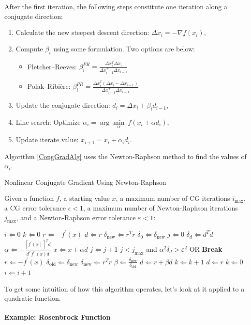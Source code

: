 After the first iteration, the following steps constitute one iteration along a conjugate direction:
\begin{enumerate}
	\item Calculate the new steepest descent direction: $\Delta x_i=-\nabla f(x_i)$,
	\item Compute $\beta_i$ using some formulation. Two options are below:
	\begin{itemize}
		\item Fletcher--Reeves: $\beta_i^{FR}=\frac{\Delta x_i^T\Delta x_i}{\Delta x_{i-1}^T\Delta x_{i-1}}$
		\item Polak--Ribi\`{e}re: $\beta_{i}^{PR}=\frac{\Delta x_i^T(\Delta x_i-\Delta x_{i-1})}{\Delta x_{i-1}^T\Delta x_{i-1}}$
	\end{itemize}
	\item Update the conjugate direction: $d_i=\Delta x_i+\beta_i d_{i-1}$,
	\item Line search: Optimize $\alpha_i =\arg\underset{\alpha}{\min}\ f(x_i+\alpha d_i)$,
	\item Update iterate value: $x_{i+1}=x_i+\alpha_i d_i$.
\end{enumerate}

Algorithm \ref{CongGradAlg} uses the Newton-Raphson method to find the values of $\alpha_i$.

\begin{algorithm}
	\caption{Nonlinear Conjugate Gradient Using Newton-Raphson \cite[]{Shewchuk1994}\label{CongGradAlg}}
	Given a function $f$, a starting value $x$, a maximum number of CG iterations $i_{\text{max}}$, a CG error tolerance $\epsilon<1$, a maximum number of Newton-Raphson iterations $j_{\text{max}}$, and a Newton-Raphson error tolerance $\varepsilon<1$:
	\begin{algorithmic}
		\State $i\Leftarrow 0$
		\State $k\Leftarrow 0$
		\State $r\Leftarrow -f^{\prime}(x)$
		\State $d\Leftarrow r$
		\State $\delta_{\text{new}}\Leftarrow r^Tr$
		\State $\delta_0\Leftarrow\delta_{\text{new}}$
		\State $j\Leftarrow 0$
		\State $\delta_d\Leftarrow d^Td$
		\State $\alpha\Leftarrow -\frac{\left[f^{\prime}(x)\right]^Td}{d^Tf^{\prime\prime}(x)d}$
		\State $x\Leftarrow x+\alpha d$
		\State $j\Leftarrow j+1$
		\State $j<j_{\text{max}}$ and $\alpha^2\delta_d>\varepsilon^2$ OR \textbf{Break}
		\EndWhile
		\State $r\Leftarrow -f^{\prime}(x)$
		\State $\delta_{\text{old}}\Leftarrow\delta_{\text{new}}$
		\State $\delta_{\text{new}}\Leftarrow r^T r$
		\State $\beta\Leftarrow\frac{\delta_{\text{new}}}{\delta_{\text{old}}}$
		\State $d\Leftarrow r+\beta d$
		\State $k\Leftarrow k+1$
		\State $d\Leftarrow r$
		\State $k\Leftarrow 0$
		\EndIf
		\State $i\Leftarrow i+1$
		\EndWhile
	\end{algorithmic}
\end{algorithm}

To get some intuition of how this algorithm operates, let's look at it applied to a quadratic function.

\paragraph{Example: Rosenbrock Function}